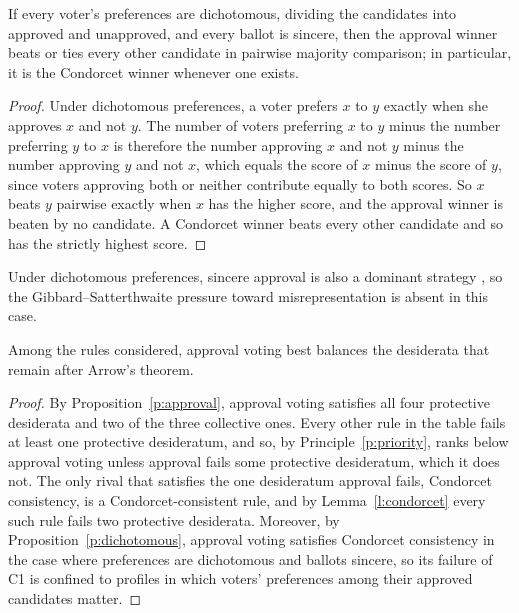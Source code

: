 \documentclass{situationist-preprint}
\begin{document}
\begin{proposition}\label{p:dichotomous}
If every voter's preferences are dichotomous, dividing the candidates into approved and unapproved, and every ballot is sincere, then the approval winner beats or ties every other candidate in pairwise majority comparison; in particular, it is the Condorcet winner whenever one exists.
\end{proposition}

\begin{proof}
Under dichotomous preferences, a voter prefers $x$ to $y$ exactly when she approves $x$ and not $y$. The number of voters preferring $x$ to $y$ minus the number preferring $y$ to $x$ is therefore the number approving $x$ and not $y$ minus the number approving $y$ and not $x$, which equals the score of $x$ minus the score of $y$, since voters approving both or neither contribute equally to both scores. So $x$ beats $y$ pairwise exactly when $x$ has the higher score, and the approval winner is beaten by no candidate. A Condorcet winner beats every other candidate and so has the strictly highest score.
\end{proof}

Under dichotomous preferences, sincere approval is also a dominant strategy \citep{BramsFishburn1978}, so the Gibbard--Satterthwaite pressure toward misrepresentation is absent in this case.

\begin{theorem}\label{t:main}
Among the rules considered, approval voting best balances the desiderata that remain after Arrow's theorem.
\end{theorem}

\begin{proof}
By Proposition~\ref{p:approval}, approval voting satisfies all four protective desiderata and two of the three collective ones. Every other rule in the table fails at least one protective desideratum, and so, by Principle~\ref{p:priority}, ranks below approval voting unless approval fails some protective desideratum, which it does not. The only rival that satisfies the one desideratum approval fails, Condorcet consistency, is a Condorcet-consistent rule, and by Lemma~\ref{l:condorcet} every such rule fails two protective desiderata. Moreover, by Proposition~\ref{p:dichotomous}, approval voting satisfies Condorcet consistency in the case where preferences are dichotomous and ballots sincere, so its failure of C1 is confined to profiles in which voters' preferences among their approved candidates matter.
\end{proof}
\end{document}
